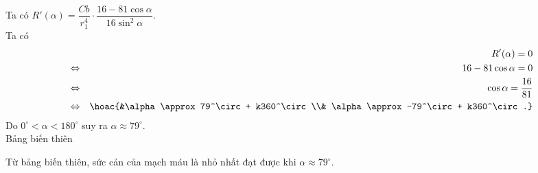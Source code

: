 \begin{ex}
{Ta có $R'(\alpha)=\dfrac{Cb}{r_1^4}\cdot\dfrac{16-81\cos\alpha}{16\sin^2\alpha}$.\\
Ta có
\begin{eqnarray*}
&& R'(\alpha)=0 \\
&\Leftrightarrow& 16-81\cos\alpha=0 \\
&\Leftrightarrow& \cos\alpha=\dfrac{16}{81} \\
&\Leftrightarrow& \hoac{&\alpha\approx 79^\circ + k360^\circ \\& \alpha\approx -79^\circ + k360^\circ.}
\end{eqnarray*}
Do $0^\circ < \alpha < 180^\circ$ suy ra $\alpha\approx 79^\circ$.\\
Bảng biến thiên
\begin{center}
\end{center}
Từ bảng biến thiên, sức cản của mạch máu là nhỏ nhất đạt được khi $\alpha\approx 79^\circ$.
}
\end{ex}

